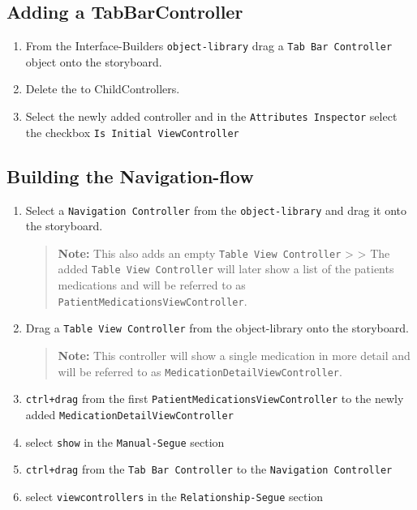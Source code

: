 \documentclass{article}
\begin{document}
\subsection{Adding a TabBarController}\label{adding-a-tabbarcontroller}

\begin{enumerate}
\def\labelenumi{\arabic{enumi}.}

\item
  From the Interface-Builders \texttt{object-library} drag a
  \texttt{Tab\ Bar\ Controller} object onto the storyboard.
\item
  Delete the to ChildControllers.
\item
  Select the newly added controller and in the
  \texttt{Attributes\ Inspector} select the checkbox
  \texttt{Is\ Initial\ ViewController}
\end{enumerate}

\subsection{Building the Navigation-flow}\label{building-the-navigation-flow}

\begin{enumerate}
\def\labelenumi{\arabic{enumi}.}
\item
  Select a \texttt{Navigation\ Controller} from the
  \texttt{object-library} and drag it onto the storyboard.
  \begin{quote}
    \textbf{Note:} This also adds an empty
    \texttt{Table\ View\ Controller} \textgreater{} \textgreater{} The
    added \texttt{Table\ View\ Controller} will later show a list of the
    patients medications and will be referred to as
    \texttt{PatientMedicationsViewController}.
  \end{quote}
\item
  Drag a \texttt{Table\ View\ Controller} from the object-library onto
  the storyboard.

  \begin{quote}
    \textbf{Note:} This controller will show
    a single medication in more detail and will be referred to as
    \texttt{MedicationDetailViewController}.
  \end{quote}
\item
  \texttt{ctrl+drag} from the first
  \texttt{PatientMedicationsViewController} to the newly added
  \texttt{MedicationDetailViewController}
\item
  select \texttt{show} in the \texttt{Manual-Segue} section
\item
  \texttt{ctrl+drag} from the \texttt{Tab\ Bar\ Controller} to the
  \texttt{Navigation\ Controller}
\item
  select \texttt{viewcontrollers} in the \texttt{Relationship-Segue}
  section
\end{enumerate}
\end{document}

